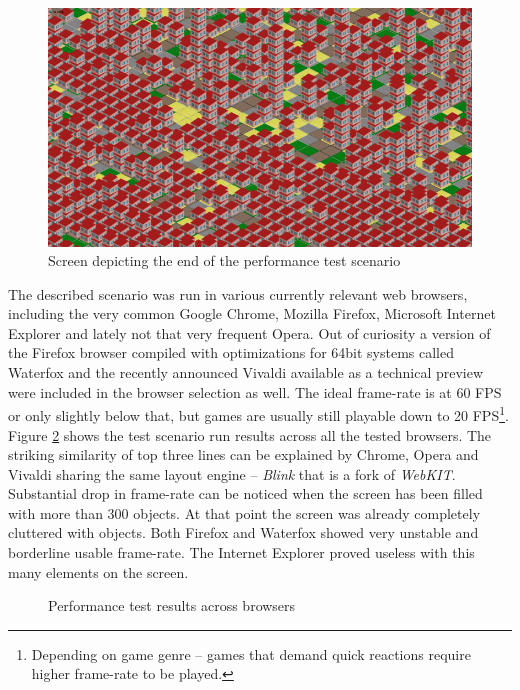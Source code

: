 \documentclass[11pt,oneside, final]{fithesis2}
\begin{document}
\begin{figure}[h]
	\centering
	\includegraphics[width=\textwidth]{thesis-performance-finish}
	\caption{Screen depicting the end of the performance test scenario}
	\label{performance-finish}
\end{figure}

The described scenario was run in various currently relevant web browsers, including the very common Google Chrome, Mozilla Firefox, Microsoft Internet Explorer and lately not that very frequent Opera. Out of curiosity a version of the Firefox browser compiled with optimizations for 64bit systems called Waterfox\cite{waterfox} and the recently announced Vivaldi available as a technical preview\cite{vivaldi} were included in the browser selection as well. The ideal frame-rate is at 60 FPS or only slightly below that, but games are usually still playable down to 20 FPS\footnote{Depending on game genre -- games that demand quick reactions require higher frame-rate to be played.}. Figure \ref{performance-basic} shows the test scenario run results across all the tested browsers. The striking similarity of top three lines can be explained by Chrome, Opera and Vivaldi sharing the same layout engine -- \emph{Blink} that is a fork of \emph{WebKIT}\cite{webkit}. Substantial drop in frame-rate can be noticed when the screen has been filled with more than 300 objects. At that point the screen was already completely cluttered with objects. Both Firefox and Waterfox showed very unstable and borderline usable frame-rate. The Internet Explorer proved useless with this many elements on the screen.

\begin{figure}[h]
	\centering
	
	\caption{Performance test results across browsers}
	\label{performance-basic}
\end{figure}
\end{document}
